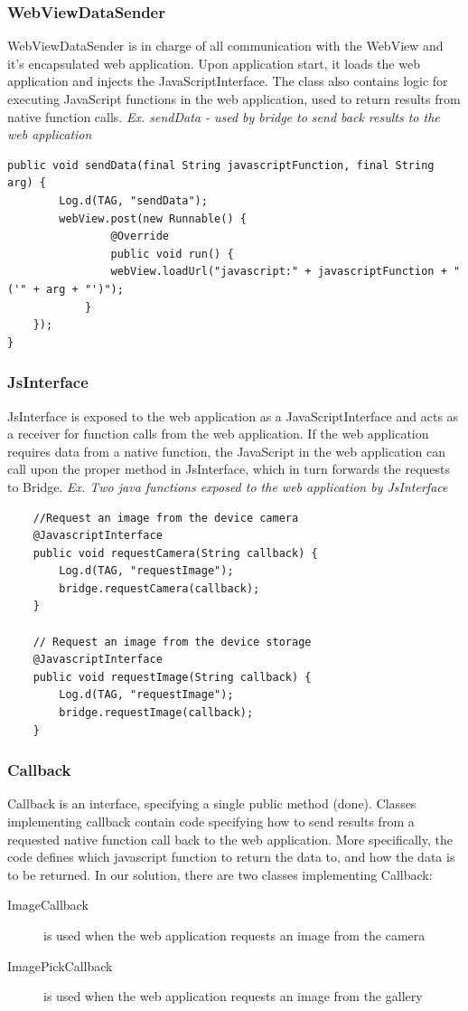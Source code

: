\subsubsection{WebViewDataSender}
WebViewDataSender is in charge of all communication with the WebView and it's encapsulated web application. Upon application start, it loads the web application and injects the JavaScriptInterface. The class also contains logic for executing JavaScript functions in the web application, used to return results from native function calls.
\emph{Ex. sendData - used by bridge to send back results to the web application}
\begin{lstlisting}
public void sendData(final String javascriptFunction, final String arg) {
        Log.d(TAG, "sendData");
        webView.post(new Runnable() {
            	@Override
            	public void run() {
        		webView.loadUrl("javascript:" + javascriptFunction + "('" + arg + "')");
    		}
	});
}
\end{lstlisting}
	
\subsubsection{JsInterface}
JsInterface is exposed to the web application as a JavaScriptInterface and acts as a receiver for function calls from the web application. If the web application requires data from a native function, the JavaScript in the web application can call upon the proper method in JsInterface, which in turn forwards the requests to Bridge.
\emph{Ex. Two java functions exposed to the web application by JsInterface}
\begin{lstlisting}
    //Request an image from the device camera
    @JavascriptInterface
    public void requestCamera(String callback) {
        Log.d(TAG, "requestImage");
        bridge.requestCamera(callback);
    }

    // Request an image from the device storage
    @JavascriptInterface
    public void requestImage(String callback) {
        Log.d(TAG, "requestImage");
        bridge.requestImage(callback);
    }
\end{lstlisting}

	
\subsubsection{Callback} 
Callback is an interface, specifying a single public method (done). Classes implementing callback contain code specifying how to send results from a requested native function call back to the web application. More specifically, the code defines which javascript function to return the data to, and how the data is to be returned. In our solution, there are two classes implementing Callback:
	\begin{description}
		\item[ImageCallback] is used when the web application requests an image from the camera
		
		\item[ImagePickCallback] is used when the web application requests an image from the gallery
	\end{description}
	
